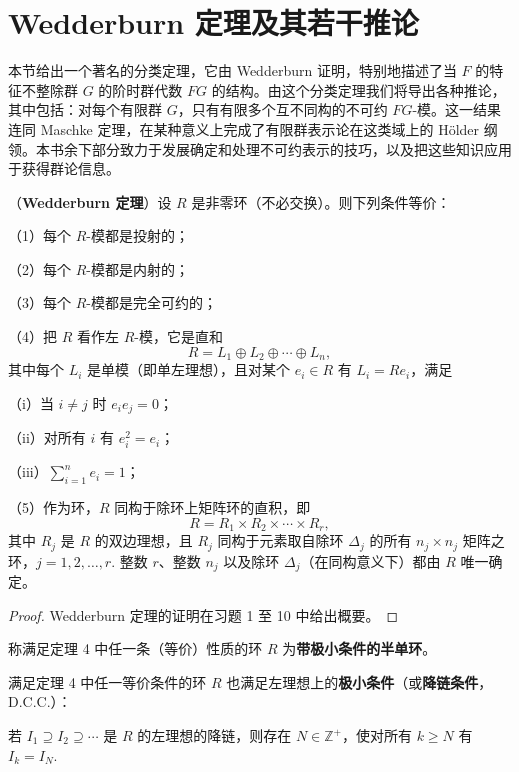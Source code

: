 \section{Wedderburn 定理及其若干推论}

本节给出一个著名的分类定理，它由 Wedderburn 证明，特别地描述了当 \(F\) 的特征不整除群 \(G\) 的阶时群代数 \(FG\) 的结构。由这个分类定理我们将导出各种推论，其中包括：对每个有限群 \(G\)，只有有限多个互不同构的不可约 \(FG\)-模。这一结果连同 Maschke 定理，在某种意义上完成了有限群表示论在这类域上的 Hölder 纲领。本书余下部分致力于发展确定和处理不可约表示的技巧，以及把这些知识应用于获得群论信息。

\begin{theorem}\label{thm:18.4}
（\textbf{Wedderburn 定理}）设 \(R\) 是非零环（不必交换）。则下列条件等价：

（1）每个 \(R\)-模都是投射的；

（2）每个 \(R\)-模都是内射的；

（3）每个 \(R\)-模都是完全可约的；

（4）把 \(R\) 看作左 \(R\)-模，它是直和
\[
R = L_1 \oplus L_2 \oplus \cdots \oplus L_n,
\]
其中每个 \(L_i\) 是单模（即单左理想），且对某个 \(e_i \in R\) 有 \(L_i = Re_i\)，满足

（i）当 \(i \neq j\) 时 \(e_ie_j = 0\)；

（ii）对所有 \(i\) 有 \(e_i^2 = e_i\)；

（iii）\(\sum_{i=1}^{n}e_i = 1\)；

（5）作为环，\(R\) 同构于除环上矩阵环的直积，即
\[
R = R_1 \times R_2 \times \cdots \times R_r,
\]
其中 \(R_j\) 是 \(R\) 的双边理想，且 \(R_j\) 同构于元素取自除环 \(\Delta_j\) 的所有 \(n_j \times n_j\) 矩阵之环，\(j = 1, 2, \ldots, r\). 整数 \(r\)、整数 \(n_j\) 以及除环 \(\Delta_j\)（在同构意义下）都由 \(R\) 唯一确定。
\end{theorem}

\begin{proof}
Wedderburn 定理的证明在习题 1 至 10 中给出概要。
\end{proof}

\begin{definition}
称满足定理 4 中任一条（等价）性质的环 \(R\) 为\textbf{带极小条件的半单环}。
\end{definition}

满足定理 4 中任一等价条件的环 \(R\) 也满足左理想上的\textbf{极小条件}（或\textbf{降链条件}，D.C.C.）：

若 \(I_1 \supseteq I_2 \supseteq \cdots\) 是 \(R\) 的左理想的降链，则存在 \(N \in \mathbb{Z}^+\)，使对所有 \(k \geq N\) 有 \(I_k = I_N\).

